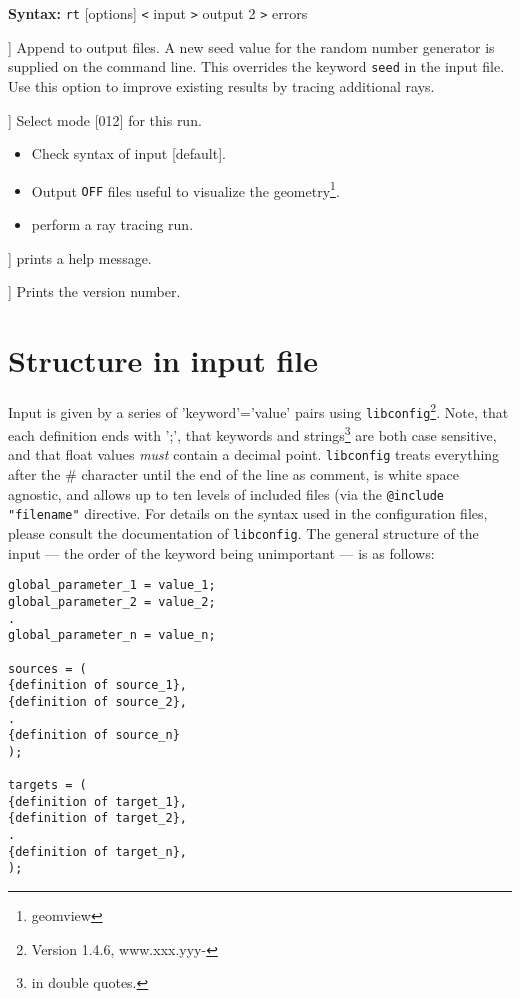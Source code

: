 \documentclass[10pt,a4paper,titlepage]{article}
\newcommand{\rt}{{\tt rt} }
\begin{document}
{\bf Syntax:} \rt [options] {\tt <} input {\tt >} output 2 {\tt >} errors
\vspace{1em}
\begin{list}{}
{\setlength{\leftmargin}{3.5cm}
\setlength{\labelwidth}{3.0cm}
\setlength{\rightmargin}{0.5cm}}

\item[\tt [--append|-a]] Append to output files. A new seed value for the random number generator is supplied on the command line. This overrides the keyword {\tt seed} in the input file. Use this option to improve existing results by tracing additional rays.

\item[\tt [--mode|-m]] Select mode [012] for this run.
\begin{itemize}
\item[\tt -m0]{Check syntax of input [default].}
\item[\tt -m1]{Output {\tt OFF} files useful to visualize the geometry\footnote{geomview}.}
\item[\tt -m2]{perform a ray tracing run.}
\end{itemize}

\item[\tt [--help|-h]] prints a help message.

\item[\tt [--Version|-V]] Prints the version number.

\end{list}


\section{Structure in input file}
Input is given by a series of 'keyword'='value' pairs using {\tt libconfig}\footnote{Version 1.4.6, www.xxx.yyy-}. Note, that each definition ends with ';', that keywords and strings\footnote{in double quotes.} are both case sensitive, and that float values \emph{must} contain a decimal point. {\tt libconfig} treats everything after the \# character until the end of the line as comment, is white space agnostic, and allows up to ten levels of included files (via the {\tt @include "filename"} directive. For details on the syntax used in the configuration files, please consult the documentation of {\tt libconfig}.
The general structure of the input --- the order of the keyword being unimportant --- is as follows:

\begin{verbatim}
global_parameter_1 = value_1;
global_parameter_2 = value_2;
.
global_parameter_n = value_n;

sources = (
{definition of source_1},
{definition of source_2},
.
{definition of source_n}
);

targets = (
{definition of target_1},
{definition of target_2},
.
{definition of target_n},
);

\end{verbatim}
\end{document}

